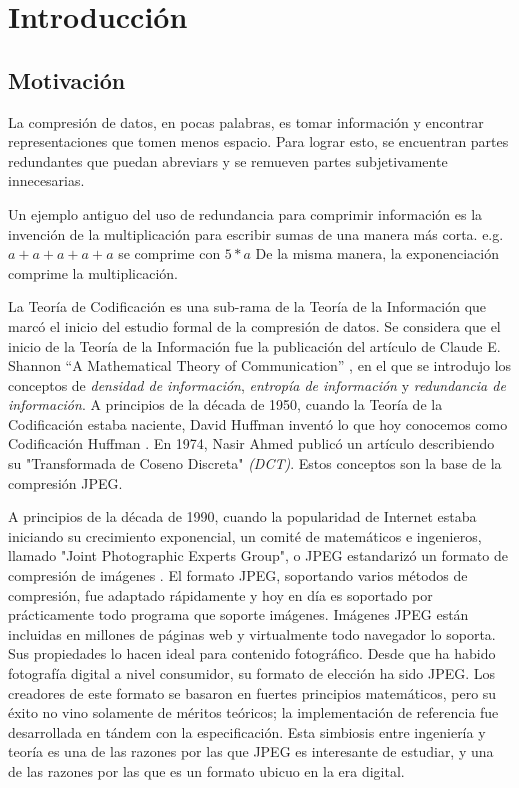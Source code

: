 \chapter{Introducción}\label{ch:introduction}


\section{Motivación}

La compresión de datos, en pocas palabras, es tomar información y encontrar representaciones que tomen menos espacio. Para lograr esto, se encuentran partes redundantes que puedan abreviars y se remueven partes subjetivamente innecesarias.

Un ejemplo antiguo del uso de redundancia para comprimir información es la invención de la multiplicación para escribir sumas de una manera más corta. e.g. $ a + a + a + a + a $ se comprime con $ 5 * a $ De la misma manera, la exponenciación comprime la multiplicación.

La Teoría de Codificación es una sub-rama de la Teoría de la Información que marcó el inicio del estudio formal de la compresión de datos. Se considera que el inicio de la Teoría de la Información fue la publicación del artículo de Claude E. Shannon ``A Mathematical Theory of Communication'' \citep{shannon}, en el que se introdujo los conceptos de \emph{densidad de información}, \emph{entropía de información} y \emph{redundancia de información}. A principios de la década de 1950, cuando la Teoría de la Codificación estaba naciente, David Huffman inventó lo que hoy conocemos como Codificación Huffman \citep{Huffman}. En 1974, Nasir Ahmed publicó un artículo describiendo su "Transformada de Coseno Discreta" \emph{(DCT)}. Estos conceptos son la base de la compresión JPEG.

A principios de la década de 1990, cuando la popularidad de Internet estaba iniciando su crecimiento exponencial, un comité de matemáticos e ingenieros, llamado "Joint Photographic Experts Group", o JPEG estandarizó un formato de compresión de imágenes \citep{JPEGSTD}. El formato JPEG, soportando varios métodos de compresión, fue adaptado rápidamente y hoy en día es soportado por prácticamente todo programa que soporte imágenes. Imágenes JPEG están incluidas en millones de páginas web y virtualmente todo navegador lo soporta. Sus propiedades lo hacen ideal para contenido fotográfico. Desde que ha habido fotografía digital a nivel consumidor, su formato de elección ha sido JPEG. Los creadores de este formato se basaron en fuertes principios matemáticos, pero su éxito no vino solamente de méritos teóricos; la implementación de referencia fue desarrollada en tándem con la especificación. Esta simbiosis entre ingeniería y teoría es una de las razones por las que JPEG es interesante de estudiar, y una de las razones por las que es un formato ubicuo en la era digital.

